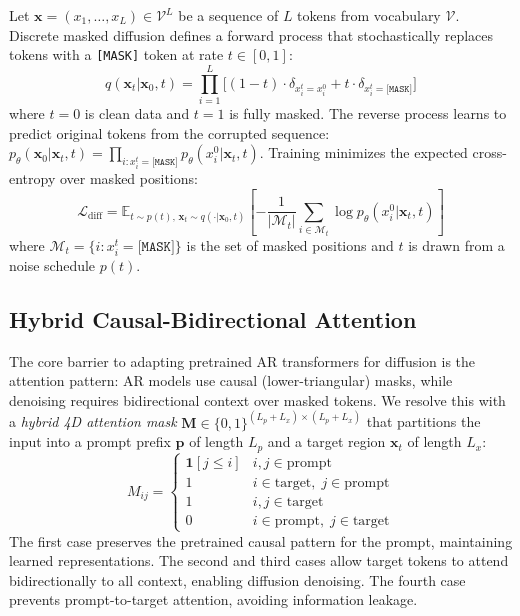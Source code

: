\documentclass{article}
\newcommand{\mask}{\texttt{[MASK]}}
\newcommand{\E}{\mathbb{E}}
\newcommand{\V}{\mathcal{V}}
\begin{document}
Let $\mathbf{x} = (x_1, \ldots, x_L) \in \V^L$ be a sequence of $L$ tokens from vocabulary $\V$.
Discrete masked diffusion defines a forward process that stochastically replaces tokens with a \mask{} token at rate $t \in [0, 1]$:
\begin{equation}
    q(\mathbf{x}_t | \mathbf{x}_0, t) = \prod_{i=1}^{L} \bigl[ (1{-}t) \cdot \delta_{x_i^t = x_i^0} + t \cdot \delta_{x_i^t = \mask} \bigr]
    \label{eq:forward}
\end{equation}
where $t{=}0$ is clean data and $t{=}1$ is fully masked.
The reverse process learns to predict original tokens from the corrupted sequence: $p_\theta(\mathbf{x}_0 | \mathbf{x}_t, t) = \prod_{i: x_i^t = \mask} p_\theta(x_i^0 | \mathbf{x}_t, t)$.
Training minimizes the expected cross-entropy over masked positions:
\begin{equation}
    \mathcal{L}_{\text{diff}} = \E_{t \sim p(t),\, \mathbf{x}_t \sim q(\cdot|\mathbf{x}_0, t)} \left[ - \frac{1}{|\mathcal{M}_t|}\sum_{i \in \mathcal{M}_t} \log p_\theta(x_i^0 | \mathbf{x}_t, t) \right]
    \label{eq:loss}
\end{equation}
where $\mathcal{M}_t = \{i : x_i^t = \mask\}$ is the set of masked positions and $t$ is drawn from a noise schedule $p(t)$.

\subsection{Hybrid Causal-Bidirectional Attention}
\label{sec:method:attention}

The core barrier to adapting pretrained AR transformers for diffusion is the attention pattern: AR models use causal (lower-triangular) masks, while denoising requires bidirectional context over masked tokens.
We resolve this with a \emph{hybrid 4D attention mask} $\mathbf{M} \in \{0,1\}^{(L_p+L_x) \times (L_p+L_x)}$ that partitions the input into a prompt prefix $\mathbf{p}$ of length $L_p$ and a target region $\mathbf{x}_t$ of length $L_x$:
\begin{equation}
    M_{ij} = \begin{cases}
        \mathbf{1}[j \leq i] & i, j \in \text{prompt} \\
        1 & i \in \text{target},\; j \in \text{prompt} \\
        1 & i, j \in \text{target} \\
        0 & i \in \text{prompt},\; j \in \text{target}
    \end{cases}
    \label{eq:attn}
\end{equation}
The first case preserves the pretrained causal pattern for the prompt, maintaining learned representations.
The second and third cases allow target tokens to attend bidirectionally to all context, enabling diffusion denoising.
The fourth case prevents prompt-to-target attention, avoiding information leakage.
\end{document}
